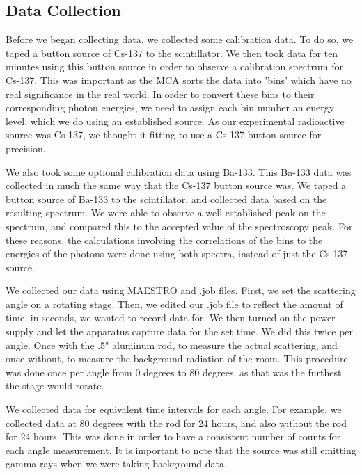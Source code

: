 \documentclass[10pt,letterpaper,onecolumn]{article}
\begin{document}
\subsection{Data Collection}
Before we began collecting data, we collected some calibration data. To do so, we taped a button source of Cs-137 to the scintillator. We then took data for ten minutes using this button source in order to observe a calibration spectrum for Cs-137. This was important as the MCA sorts the data into 'bins' which have no real significance in the real world. In order to convert these bins to their corresponding photon energies, we need to assign each bin number an energy level, which we do using an established source. As our experimental radioactive source was Cs-137, we thought it fitting to use a Cs-137 button source for precision. 


We also took some optional calibration data using Ba-133. This Ba-133 data was collected in much the same way that the Cs-137 button source was. We taped a button source of Ba-133 to the scintillator, and collected data based on the resulting spectrum. We were able to observe a well-established peak on the spectrum, and compared this to the accepted value of the spectroscopy peak. For these reasons, the calculations involving the correlations of the bins to the energies of the photons were done using both spectra, instead of just the Cs-137 source.


We collected our data using MAESTRO and .job files. First, we set the scattering angle on a rotating stage. Then, we edited our .job file to reflect the amount of time, in seconds, we wanted to record data for. We then turned on the power supply and let the apparatus capture data for the set time. We did this twice per angle. Once with the .5" aluminum rod, to measure the actual scattering, and once without, to measure the background radiation of the room. This procedure was done once per angle from 0 degrees to 80 degrees, as that was the furthest the stage would rotate.


We collected data for equivalent time intervals for each angle. For example. we collected data at 80 degrees with the rod for 24 hours, and also without the rod for 24 hours. This was done in order to have a consistent number of counts for each angle measurement. It is important to note that the source was still emitting gamma rays when we were taking background data.
\end{document}
